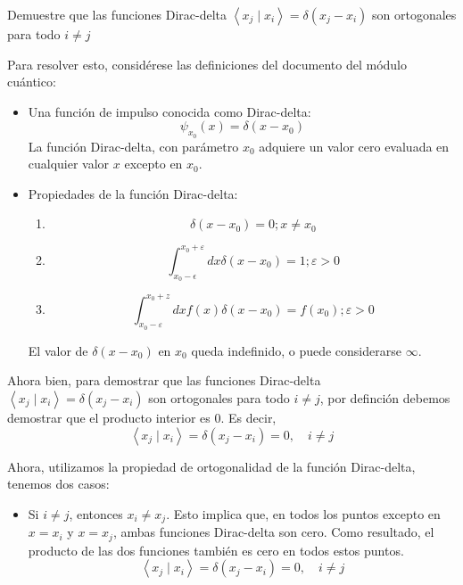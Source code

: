 





\begin{problema}
    Demuestre que las funciones Dirac-delta $\left\langle x_j \mid x_i\right\rangle=\delta\left(x_j-x_i\right)$ son ortogonales para todo $i \neq j$
    \begin{sol}
        Para resolver esto, considérese las definiciones del documento del módulo cuántico: 
        \begin{itemize}
            \item Una función de impulso conocida como Dirac-delta:
            $$
            \psi_{x_0}(x)=\delta\left(x-x_0\right)
            $$
            La función Dirac-delta, con parámetro $x_0$ adquiere un valor cero evaluada en cualquier valor $x$ excepto en $x_0$. 
            \item Propiedades de la función Dirac-delta:
            \begin{enumerate}
                \item $$\delta\left(x-x_0\right)=0 ; x \neq x_0$$
                \item $$\int_{x_0-\epsilon}^{x_0+\varepsilon} d x \delta\left(x-x_0\right)=1 ; \varepsilon>0$$
                \item $$\int_{x_0-\varepsilon}^{x_0+z} d x f(x) \delta\left(x-x_0\right)=f\left(x_0\right) ; \varepsilon>0$$
            \end{enumerate}
            El valor de $\delta\left(x-x_0\right)$ en $x_0$ queda indefinido, o puede considerarse $\infty$.
        \end{itemize}





        Ahora bien, para demostrar que las funciones Dirac-delta $\left\langle x_j \mid x_i\right\rangle=\delta\left(x_j-x_i\right)$ son ortogonales para todo $i \neq j$, por definción debemos demostrar que el producto interior es 0. Es decir, 
        $$\left\langle x_j \mid x_i\right\rangle=\delta\left(x_j-x_i\right)=0, \quad i\neq j$$

Ahora, utilizamos la propiedad de ortogonalidad de la función Dirac-delta, tenemos dos casos: 

\begin{itemize}
    \item Si $i \neq j$, entonces $x_i \neq x_j$. Esto implica que, en todos los puntos excepto en $x = x_i$ y $x = x_j$, ambas funciones Dirac-delta son cero. Como resultado, el producto de las dos funciones también es cero en todos estos puntos.
    $$\left\langle x_j \mid x_i\right\rangle=\delta\left(x_j-x_i\right)=0, \quad i\neq j$$


\end{itemize}
\end{sol}
\end{problema}
